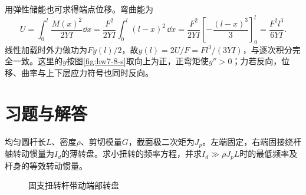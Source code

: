 \begin{solution}
用弹性储能也可求得端点位移。弯曲能为
\[
 U=\int_0^l\frac{M(x)^2}{2YI}\dd x
 =\frac{F^2}{2YI}\int_0^l(l-x)^2\,\dd x
 =\frac{F^2}{2YI}\left[-\frac{(l-x)^3}{3}\right]_0^l
 =\frac{F^2l^3}{6YI}.
\]
线性加载时外力做功为$Fy(l)/2$，故$y(l)=2U/F=Fl^3/(3YI)$，与逐次积分完全一致。这里的$y$按图\ref{fig:hw7-8-s}取向上为正，正弯矩使$y''>0$；力若反向，位移、曲率与上下层应力符号也同时反向。

\end{solution}




\section{习题与解答}

\begin{exercise}[端部转盘与扭转杆]\label{ex:sup7-torsion}
均匀圆杆长$L$、密度$\rho$、剪切模量$G$，截面极二次矩为$J_p$。左端固定，右端固接绕杆轴转动惯量为$I_d$的薄转盘。求小扭转的频率方程，并求$I_d\gg\rho J_pL$时的最低频率及杆身的等效转动惯量。
\begin{figure}[H]\centering
{}
\caption{固支扭转杆带动端部转盘}\label{fig:sup7-torsion-q}
\end{figure}
\end{exercise}
